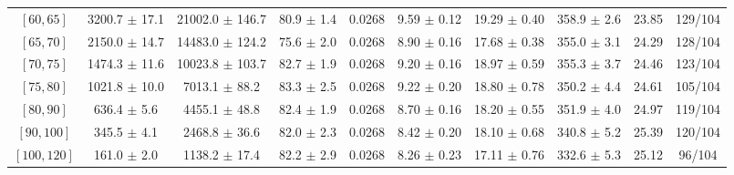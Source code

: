 \begin{tabular}{c||c|c|c|c|c|c|c||c|c}
$[60, 65]$ & 3200.7 $\pm$ 17.1 & 21002.0 $\pm$ 146.7 & 80.9 $\pm$ 1.4 & 0.0268 & 9.59 $\pm$ 0.12 & 19.29 $\pm$ 0.40 & 358.9 $\pm$ 2.6 & 23.85 & 129/104\\
$[65, 70]$ & 2150.0 $\pm$ 14.7 & 14483.0 $\pm$ 124.2 & 75.6 $\pm$ 2.0 & 0.0268 & 8.90 $\pm$ 0.16 & 17.68 $\pm$ 0.38 & 355.0 $\pm$ 3.1 & 24.29 & 128/104\\
$[70, 75]$ & 1474.3 $\pm$ 11.6 & 10023.8 $\pm$ 103.7 & 82.7 $\pm$ 1.9 & 0.0268 & 9.20 $\pm$ 0.16 & 18.97 $\pm$ 0.59 & 355.3 $\pm$ 3.7 & 24.46 & 123/104\\
$[75, 80]$ & 1021.8 $\pm$ 10.0 & 7013.1 $\pm$ 88.2 & 83.3 $\pm$ 2.5 & 0.0268 & 9.22 $\pm$ 0.20 & 18.80 $\pm$ 0.78 & 350.2 $\pm$ 4.4 & 24.61 & 105/104\\
$[80, 90]$ & 636.4 $\pm$ 5.6 & 4455.1 $\pm$ 48.8 & 82.4 $\pm$ 1.9 & 0.0268 & 8.70 $\pm$ 0.16 & 18.20 $\pm$ 0.55 & 351.9 $\pm$ 4.0 & 24.97 & 119/104\\
$[90, 100]$ & 345.5 $\pm$ 4.1 & 2468.8 $\pm$ 36.6 & 82.0 $\pm$ 2.3 & 0.0268 & 8.42 $\pm$ 0.20 & 18.10 $\pm$ 0.68 & 340.8 $\pm$ 5.2 & 25.39 & 120/104\\
$[100, 120]$ & 161.0 $\pm$ 2.0 & 1138.2 $\pm$ 17.4 & 82.2 $\pm$ 2.9 & 0.0268 & 8.26 $\pm$ 0.23 & 17.11 $\pm$ 0.76 & 332.6 $\pm$ 5.3 & 25.12 & 96/104\\
\end{tabular}
